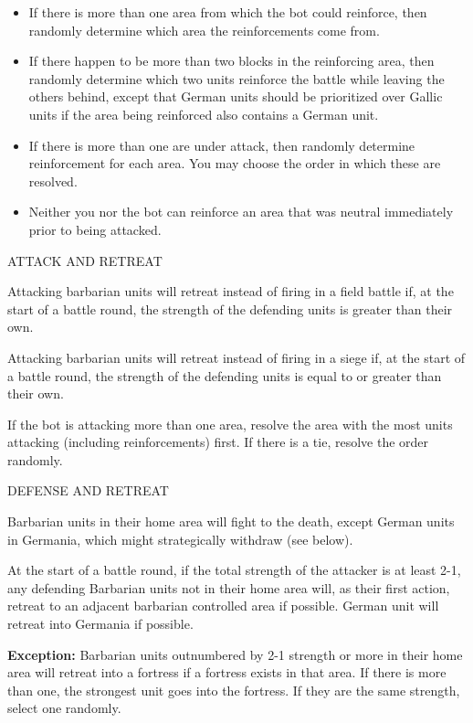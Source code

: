 \begin{itemize}
  \item If there is more than one area from which the bot could reinforce, then randomly determine which area the reinforcements come from.

  \item If there happen to be more than two blocks in the reinforcing area, then randomly determine which two units reinforce the battle while leaving the others behind, except that German units should be prioritized over Gallic units if the area being reinforced also contains a German unit.

  \item If there is more than one are under attack, then randomly determine reinforcement for each area. You may choose the order in which these are resolved.

  \item Neither you nor the bot can reinforce an area that was neutral immediately prior to being attacked.
\end{itemize}

\label{solitaire:attack_and_retreat}ATTACK AND RETREAT

Attacking barbarian units will retreat instead of firing in a field battle if, at the start of a battle round, the strength of the defending units is greater than their own.

Attacking barbarian units will retreat instead of firing in a siege if, at the start of a battle round, the strength of the defending units is equal to or greater than their own.

If the bot is attacking more than one area, resolve the area with the most units attacking (including reinforcements) first. If there is a tie, resolve the order randomly.

\label{solitaire:defense_and_retreat}DEFENSE AND RETREAT

Barbarian units in their home area will fight to the death, except German units in Germania, which might strategically withdraw (see below).

At the start of a battle round, if the total strength of the attacker is at least 2-1, any defending Barbarian units not in their home area will, as their first action, retreat to an adjacent barbarian controlled area if possible. German unit will retreat into Germania if possible.

\textbf{Exception:} Barbarian units outnumbered by 2-1 strength or more in their home area will retreat into a fortress if a fortress exists in that area. If there is more than one, the strongest unit goes into the fortress. If they are the same strength, select one randomly.

